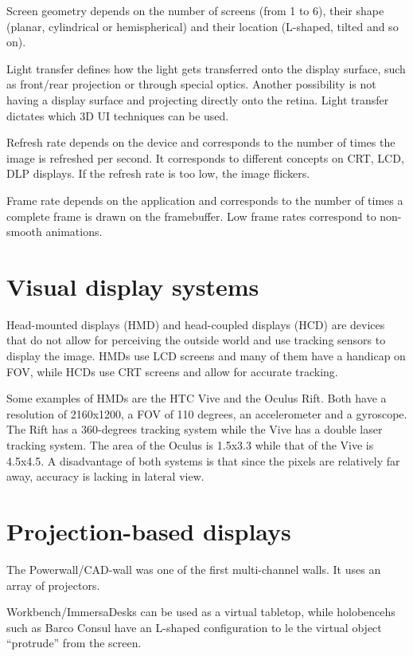 \documentclass[a4paper]{article}
\begin{document}
Screen geometry depends on the number of screens (from 1 to 6), their
shape (planar, cylindrical or hemispherical) and their location
(L-shaped, tilted and so on).

Light transfer defines how the light gets transferred onto the display
surface, such as front/rear projection or through special optics.
Another possibility is not having a display surface and projecting
directly onto the retina. Light transfer dictates which 3D UI techniques
can be used.

Refresh rate depends on the device and corresponds to the number of
times the image is refreshed per second. It corresponds to different
concepts on CRT, LCD, DLP displays. If the refresh rate is too low, the
image flickers.

Frame rate depends on the application and corresponds to the number of
times a complete frame is drawn on the framebuffer. Low frame rates
correspond to non-smooth animations.


\section{Visual display systems}

Head-mounted displays (HMD) and head-coupled displays (HCD) are devices
that do not allow for perceiving the outside world and use tracking
sensors to display the image. HMDs use LCD screens and many of them have
a handicap on FOV, while HCDs use CRT screens and allow for accurate
tracking.

Some examples of HMDs are the HTC Vive and the Oculus Rift. Both have a
resolution of 2160x1200, a FOV of 110 degrees, an accelerometer and a
gyroscope. The Rift has a 360-degrees tracking system while the Vive has
a double laser tracking system. The area of the Oculus is 1.5x3.3 while
that of the Vive is 4.5x4.5. A disadvantage of both systems is that
since the pixels are relatively far away, accuracy is lacking in lateral
view.


\section{Projection-based displays}

The Powerwall/CAD-wall was one of the first multi-channel walls. It uses
an array of projectors.

Workbench/ImmersaDesks can be used as a virtual tabletop, while
holobencehs such as Barco Consul have an L-shaped configuration to le
the virtual object ``protrude'' from the screen.
\end{document}
